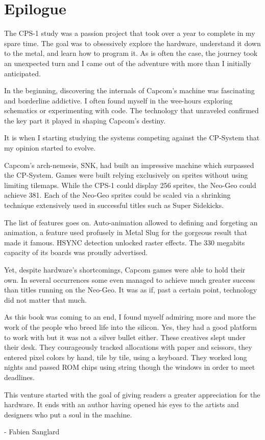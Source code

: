 \chapter{Epilogue} 

The CPS-1 study was a passion project that took over a year to complete in my spare time. The goal was to obsessively explore the hardware, understand it down to the metal, and learn how to program it. As is often the case, the journey took an unexpected turn and I came out of the adventure with more than I initially anticipated.

In the beginning, discovering the internals of Capcom's machine was fascinating and borderline addictive. I often found myself in the wee-hours exploring schematics or experimenting with code. The technology that unraveled confirmed the key part it played in shaping Capcom's destiny. 

It is when I starting studying the systems competing against the CP-System that my opinion started to evolve. 

Capcom's arch-nemesis, SNK, had built an impressive machine which surpassed the CP-System. Games were built relying exclusively on sprites without using limiting tilemaps. While the CPS-1 could display 256 sprites, the Neo-Geo could achieve 381. Each of the Neo-Geo sprites could be scaled via a shrinking technique extensively used in successful titles such as Super Sidekicks. 

The list of features goes on. Auto-animation allowed to defining and forgeting an animation, a feature used profusely in Metal Slug for the gorgeous result that made it famous. HSYNC detection unlocked raster effects. The 330 megabits capacity of its boards was proudly advertised.

Yet, despite hardware's shortcomings, Capcom games were able to hold their own. In several occurrences some even managed to achieve much greater success than titles running on the Neo-Geo. It was as if, past a certain point, technology did not matter that much.

As this book was coming to an end, I found myself admiring more and more the work of the people who breed life into the silicon. Yes, they had a good platform to work with but it was not a silver bullet either. These creatives slept under their desk. They courageously tracked allocations with paper and scissors, they entered pixel colors by hand, tile by tile, using a keyboard. They worked long nights and passed ROM chips using string though the windows in order to meet deadlines.

This venture started with the goal of giving readers a greater appreciation for the hardware. It ends with an author having opened his eyes to the artists and designers who put a soul in the machine.

- Fabien Sanglard
